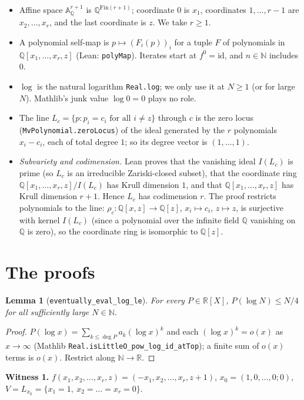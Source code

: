 \documentclass[11pt]{article}
\newtheorem{lemma}[theorem]{Lemma}
\theoremstyle{definition}
\theoremstyle{remark}
\newcommand{\A}{\mathbb{A}}
\newcommand{\Q}{\mathbb{Q}}
\newcommand{\R}{\mathbb{R}}
\newcommand{\N}{\mathbb{N}}
\begin{document}
\begin{itemize}
\item Affine space $\A^{r+1}_\Q$ is $\Q^{\mathrm{Fin}(r+1)}$; coordinate $0$ is $x_1$, coordinates
  $1,\dots,r-1$ are $x_2,\dots,x_r$, and the last coordinate is $z$. We take $r\ge1$.
\item A polynomial self-map is $p\mapsto (F_i(p))_i$ for a tuple $F$ of polynomials in
  $\Q[x_1,\dots,x_r,z]$ (Lean: \texttt{polyMap}). Iterates start at $f^0=\mathrm{id}$, and $n\in\N$
  includes $0$.
\item $\log$ is the natural logarithm \texttt{Real.log}; we only use it at $N\ge1$ (or for large
  $N$). Mathlib's junk value $\log 0=0$ plays no role.
\item The line $L_c=\{p: p_i=c_i \text{ for all } i\neq z\}$ through $c$ is the zero locus
  (\texttt{MvPolynomial.zeroLocus}) of the ideal generated by the $r$ polynomials $x_i-c_i$, each of
  total degree $1$; so its degree vector is $(1,\dots,1)$.
\item \emph{Subvariety and codimension.} Lean proves that the vanishing ideal $I(L_c)$ is prime (so
  $L_c$ is an irreducible Zariski-closed subset), that the coordinate ring
  $\Q[x_1,\dots,x_r,z]/I(L_c)$ has Krull dimension $1$, and that $\Q[x_1,\dots,x_r,z]$ has Krull
  dimension $r+1$. Hence $L_c$ has codimension $r$. The proof restricts polynomials to the line:
  $\rho_c:\Q[x,z]\to\Q[z]$, $x_i\mapsto c_i$, $z\mapsto z$, is surjective with kernel $I(L_c)$
  (since a polynomial over the infinite field $\Q$ vanishing on $\Q$ is zero), so the coordinate
  ring is isomorphic to $\Q[z]$.
\end{itemize}

\section{The proofs}

\begin{lemma}[\texttt{eventually\_eval\_log\_le}]
For every $P\in\R[X]$, $P(\log N)\le N/4$ for all sufficiently large $N\in\N$.
\end{lemma}
\begin{proof}
$P(\log x)=\sum_{k\le\deg P}a_k(\log x)^k$ and each $(\log x)^k=o(x)$ as $x\to\infty$
(Mathlib \texttt{Real.isLittleO\_pow\_log\_id\_atTop}); a finite sum of $o(x)$ terms is $o(x)$.
Restrict along $\N\to\R$.
\end{proof}

\textbf{Witness 1.} $f(x_1,x_2,\dots,x_r,z)=(-x_1,x_2,\dots,x_r,z+1)$, $x_0=(1,0,\dots,0;0)$,
$V=L_{x_0}=\{x_1=1,\ x_2=\dots=x_r=0\}$.
\end{document}
